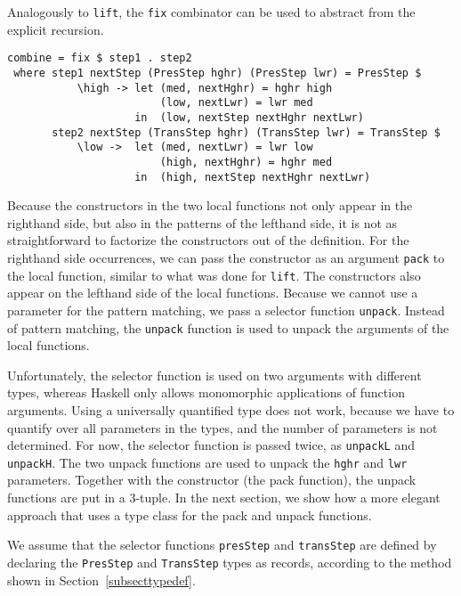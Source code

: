 Analogously to \texttt{lift}, the \texttt{fix} combinator can be used to abstract from the explicit recursion.

\begin{small}
\begin{verbatim}
combine = fix $ step1 . step2
 where step1 nextStep (PresStep hghr) (PresStep lwr) = PresStep $
           \high -> let (med, nextHghr) = hghr high
                        (low, nextLwr) = lwr med
                    in  (low, nextStep nextHghr nextLwr)
       step2 nextStep (TransStep hghr) (TransStep lwr) = TransStep $
           \low ->  let (med, nextLwr) = lwr low
                        (high, nextHghr) = hghr med
                    in  (high, nextStep nextHghr nextLwr)
\end{verbatim}
\end{small}

Because the constructors in the two local functions not only appear in the righthand side, but also in the patterns of the lefthand side, it is not as straightforward to factorize the constructors out of the definition. For the righthand side occurrences, we can pass the constructor as an argument \texttt{pack} to the local function, similar to what was done for \texttt{lift}. The constructors also appear on the lefthand side of the local functions. Because we cannot use a parameter for the pattern matching, we pass a selector function \texttt{unpack}. Instead of pattern matching, the \texttt{unpack} function is used to unpack the arguments of the local functions.

Unfortunately, the selector function is used on two arguments with different types, whereas Haskell only allows monomorphic applications of function arguments. Using a universally quantified type does not work, because we have to quantify over all parameters in the types, and the number of parameters is not determined. For now, the selector function is passed twice, as \texttt{unpackL} and \texttt{unpackH}. The two unpack functions are used to unpack the \texttt{hghr} and \texttt{lwr} parameters. Together with the constructor (the pack function), the unpack functions are put in a 3-tuple. In the next section, we show how a more elegant approach that uses a type class for the pack and unpack functions.

We assume that the selector functions \texttt{presStep} and \texttt{transStep} are defined by declaring the \texttt{PresStep} and \texttt{TransStep} types as records, according to the method shown in Section~\ref{subsecttypedef}.

